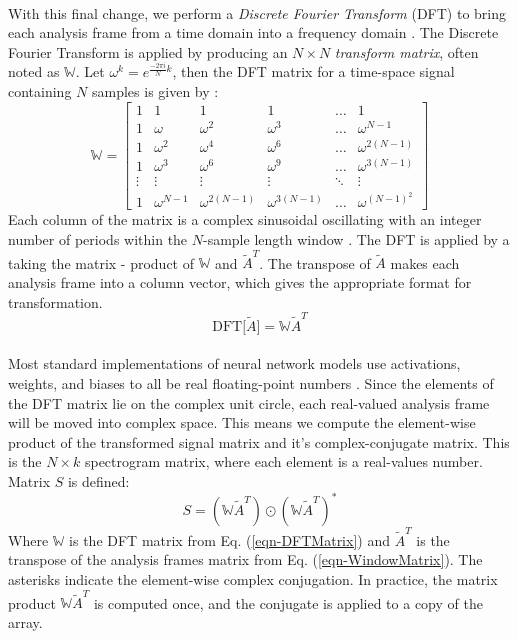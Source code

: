 \documentclass[12pt,letterpaper]{article}
\begin{document}
\paragraph*{}With this final change, we perform a \textit{Discrete Fourier Transform} (DFT) to bring each analysis frame from a time domain into a frequency domain \cite{Olson,Peatross,Virtanen}. The Discrete Fourier Transform is applied by producing an $N \times N$ \textit{transform matrix}, often noted as $\mathbb{W}$. Let $\omega^k = e^{\frac{-2\pi i}{N}k}$, then the DFT matrix for a time-space signal containing $N$ samples is given by \cite{Taylor,Peatross,Virtanen}:
\begin{equation}
\label{eqn-DFTMatrix}
\mathbb{W} = 
\begin{bmatrix}
1 & 1 & 1 & 1 & \hdots & 1 \\
1 & \omega		& \omega^2 & \omega^3 & \hdots & \omega^{N-1} \\
1 & \omega^2	& \omega^4 & \omega^6 & \hdots & \omega^{2(N-1)} \\
1 & \omega^3	& \omega^6 & \omega^9 & \hdots & \omega^{3(N-1)} \\
\vdots & \vdots & \vdots & \vdots & \ddots & \vdots \\
1 & \omega^{N-1} & \omega^{2(N-1)} & \omega^{3(N-1)} & \hdots & \omega^{(N-1)^2}
\end{bmatrix}
\end{equation}
Each column of the matrix is a complex sinusoidal oscillating with an integer number of periods within the $N$-sample length window \cite{Short,Peatross}. The DFT is applied by a taking the matrix - product of $\mathbb{W}$ and $\widetilde{A}^T$. The transpose of $\widetilde{A}$ makes each analysis frame into a column vector, which gives the appropriate format for transformation.
\begin{equation}
\label{eqn-DFT}
\text{DFT}\big[ \widetilde{A} \big] = \mathbb{W}\widetilde{A}^T
\end{equation}

\paragraph*{}Most standard implementations of neural network models use activations, weights, and biases to all be real floating-point numbers \cite{Levine,Loy,Tensorflow}. Since the elements of the DFT matrix lie on the complex unit circle, each real-valued analysis frame will be moved into complex space. This means we compute the element-wise product of the transformed signal matrix and it's complex-conjugate matrix. This is the $N \times k$
spectrogram matrix, where each element is a real-values number. Matrix $S$ is defined:
\begin{equation}
\label{eqn-Spectrogram}
S = (\mathbb{W}\widetilde{A}^T) \odot (\mathbb{W}\widetilde{A}^T)^*
\end{equation}
Where $\mathbb{W}$ is the DFT matrix from Eq. (\ref{eqn-DFTMatrix}) and $\widetilde{A}^T$ is the transpose of the analysis frames matrix from Eq. (\ref{eqn-WindowMatrix}). The asterisks indicate the element-wise complex conjugation. In practice, the matrix product $\mathbb{W}\widetilde{A}^T$ is computed once, and the conjugate is applied to a copy of the array.
\end{document}
